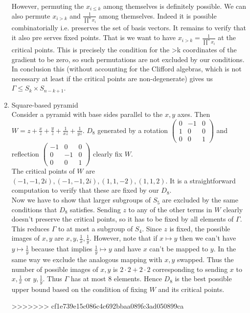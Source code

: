 \documentclass[a4paper]{article}
\begin{document}
\begin{enumerate}
	However, permuting the $x_{i\le k}$ among themselves is definitely possible. We can also permute $x_{i>k}$ and $\frac{1}{\prod^{n}x_{i}}    $ among themselves. Indeed it is possible combinatorially i.e. preserves the set of basis vectors. It remains to verify that it also pre    serves fixed points.
	That is we want to have  $x_{i>k}=\frac{1}{\prod^{n}x_{i}}$  at the critical points. This is precisely the condition for the  >k  coordinates of the gradient to be zero, so such permutations are not excluded by our conditions.\\
	In conclusion this (without accounting for the Clifford algebras, which is not necessary at least if the critical points are non-degenerate) gives us  $\Gamma \le S_{k} \times  S_{n-k+1}$.
	\item Square-based pyramid \\
	Consider a pyramid with base sides parallel to the $x,y$ axes. Then $W=z+\frac{x}{z}+\frac{y}{z}+\frac{1}{xz}+\frac{1}{yz}$. 
	$D_8$ generated by a rotation  $\begin{pmatrix} 0 & -1 &0\\ 1 & 0 & 0\\ 0& 0 &1 \end{pmatrix} $ and reflection $\begin{pmatrix} -1 & 0 & 0 \\ 0 & -1 & 0\\ 0  & 0 &1 \end{pmatrix} $ clearly fix $W$.\\
	The critical points of $W$ are $\left( -1,-1,2i \right) ,\left( -1,-1,2i \right), \left( 1,1,-    2 \right),\left( 1,1,2 \right) $. It is a straightforward computation to verify that these are fixed by our $D_8$.\\
	Now we have to show that larger subgroups of  $S_5$ are excluded by the same conditions that $D_8$ satisfies. Sending $z$ to any of the other terms in $W$ clearly doesn't preserve the critical points, so it has to be fixed by all elements of $\Gamma$.\\
	This reduces $\Gamma$ to at most a subgroup of $S_4$. Since $z$ is fixed, the possible images of $x,y$ are $x,y,\frac{1}{x},\frac{1}{y}$. However, note that if $x\mapsto y$ then we can't have $y\mapsto \frac{1}{y}$ because that implies $\frac{1}{y}\mapsto y$ and have $x$ can't be mapped to $ y$. In the same way we exclude the analogous mapping with $x,y$ swapped. Thus the number of possible images of $x,y$ is $2\cdot 2 +2\cdot 2$ corresponding to sending  $x$ to $x,\frac{1}{x}$ or $y,\frac{1}{y}$. Thus $\Gamma$ has at most 8 elements. Hence $D_8$ is the best possible upper bound based on the condition of fixing $W$ and its critical points.
	
>>>>>>> cf1e739e15c086c4c692bbaa089fc3ad050899ca
\end{enumerate} 
\end{document}
